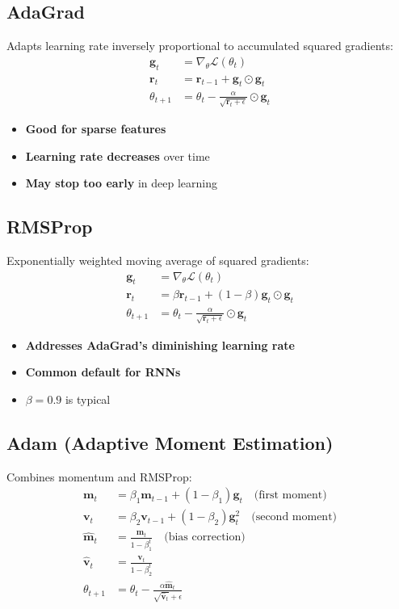 \subsection{AdaGrad}

Adapts learning rate inversely proportional to accumulated squared gradients:
\begin{align}
\mathbf{g}_t &= \nabla_\theta \mathcal{L}(\theta_t) \\
\mathbf{r}_t &= \mathbf{r}_{t-1} + \mathbf{g}_t \odot \mathbf{g}_t \\
\theta_{t+1} &= \theta_t - \frac{\alpha}{\sqrt{\mathbf{r}_t + \epsilon}} \odot \mathbf{g}_t
\end{align}

\begin{itemize}
    \item \textbf{Good for sparse features}
    \item \textbf{Learning rate decreases} over time
    \item \textbf{May stop too early} in deep learning
\end{itemize}

\subsection{RMSProp}

Exponentially weighted moving average of squared gradients:
\begin{align}
\mathbf{g}_t &= \nabla_\theta \mathcal{L}(\theta_t) \\
\mathbf{r}_t &= \beta \mathbf{r}_{t-1} + (1-\beta)\mathbf{g}_t \odot \mathbf{g}_t \\
\theta_{t+1} &= \theta_t - \frac{\alpha}{\sqrt{\mathbf{r}_t + \epsilon}} \odot \mathbf{g}_t
\end{align}

\begin{itemize}
    \item \textbf{Addresses AdaGrad's diminishing learning rate}
    \item \textbf{Common default for RNNs}
    \item $\beta = 0.9$ is typical
\end{itemize}

\subsection{Adam (Adaptive Moment Estimation)}

Combines momentum and RMSProp:
\begin{align}
\mathbf{m}_t &= \beta_1 \mathbf{m}_{t-1} + (1-\beta_1)\mathbf{g}_t \quad \text{(first moment)} \\
\mathbf{v}_t &= \beta_2 \mathbf{v}_{t-1} + (1-\beta_2)\mathbf{g}_t^2 \quad \text{(second moment)} \\
\hat{\mathbf{m}}_t &= \frac{\mathbf{m}_t}{1-\beta_1^t} \quad \text{(bias correction)} \\
\hat{\mathbf{v}}_t &= \frac{\mathbf{v}_t}{1-\beta_2^t} \\
\theta_{t+1} &= \theta_t - \frac{\alpha \hat{\mathbf{m}}_t}{\sqrt{\hat{\mathbf{v}}_t} + \epsilon}
\end{align}

